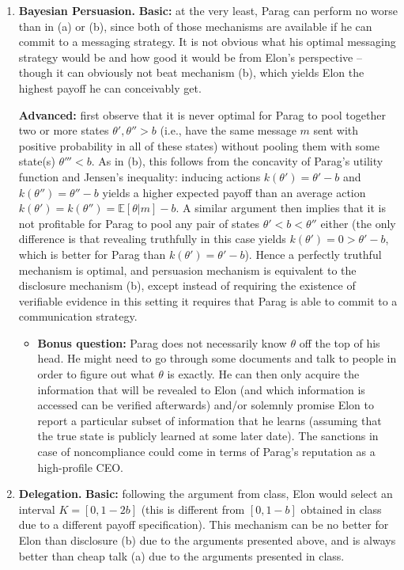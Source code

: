 \documentclass[a4paper]{article}
\begin{document}
\begin{enumerate}[label={(\alph{enumi})}]
	
	\item \textbf{Bayesian Persuasion.}
	\textbf{Basic:} at the very least, Parag can perform no worse than in (a) or (b), since both of those mechanisms are available if he can commit to a messaging strategy. It is not obvious what his optimal messaging strategy would be and how good it would be from Elon's perspective -- though it can obviously not beat mechanism (b), which yields Elon the highest payoff he can conceivably get.
	
	\textbf{Advanced:} first observe that it is never optimal for Parag to pool together two or more states $\theta',\theta'' > b$ (i.e., have the same message $m$ sent with positive probability in all of these states) without pooling them with some state(s) $\theta''' < b$. As in (b), this follows from the concavity of Parag's utility function and Jensen's inequality: inducing actions $k(\theta')=\theta'-b$ and $k(\theta'')=\theta''-b$ yields a higher expected payoff than an average action $k(\theta')=k(\theta'')=\mathbb{E}[\theta|m]-b$. A similar argument then implies that it is not profitable for Parag to pool any pair of states $\theta' < b < \theta''$ either (the only difference is that revealing truthfully in this case yields $k(\theta')=0>\theta'-b$, which is better for Parag than $k(\theta')=\theta'-b$). Hence a perfectly truthful mechanism is optimal, and persuasion mechanism is equivalent to the disclosure mechanism (b), except instead of requiring the existence of verifiable evidence in this setting it requires that Parag is able to commit to a communication strategy.
	
	\begin{itemize}
		\item \textbf{Bonus question:} Parag does not necessarily know $\theta$ off the top of his head. He might need to go through some documents and talk to people in order to figure out what $\theta$ is exactly. He can then only acquire the information that will be revealed to Elon (and which information is accessed can be verified afterwards) and/or solemnly promise Elon to report a particular subset of information that he learns (assuming that the true state is publicly learned at some later date). The sanctions in case of noncompliance could come in terms of Parag's reputation as a high-profile CEO.
	\end{itemize}


	\item \textbf{Delegation.}
	\textbf{Basic:} following the argument from class, Elon would select an interval $K = [0,1-2b]$ (this is different from $[0,1-b]$ obtained in class due to a different payoff specification). This mechanism can be no better for Elon than disclosure (b) due to the arguments presented above, and is always better than cheap talk (a) due to the arguments presented in class.


\end{enumerate}
\end{document}
